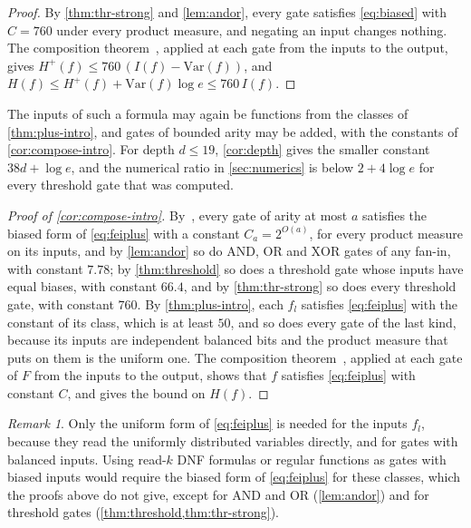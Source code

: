 \documentclass[11pt]{amsart}
\theoremstyle{definition}
\theoremstyle{remark}
\newtheorem{remark}[theorem]{Remark}
\newcommand{\Var}{\mathrm{Var}}
\begin{document}
\begin{proof}
By \cref{thm:thr-strong} and \cref{lem:andor}, every gate satisfies \eqref{eq:biased} with $C=760$ under every
product measure, and negating an input changes nothing. The composition theorem~\cite[Theorem~1]{OT13}, applied at
each gate from the inputs to the output, gives $H^+(f)\le760\,(I(f)-\Var(f))$, and
$H(f)\le H^+(f)+\Var(f)\log e\le760\,I(f)$.
\end{proof}

The inputs of such a formula may again be functions from the classes of \cref{thm:plus-intro}, and gates of bounded
arity may be added, with the constants of \cref{cor:compose-intro}. For depth $d\le19$, \cref{cor:depth} gives the
smaller constant $38d+\log e$, and the numerical ratio in \cref{sec:numerics} is below $2+4\log e$ for every threshold
gate that was computed.


\begin{proof}[Proof of \cref{cor:compose-intro}]
By~\cite[Theorem~2]{OT13}, every gate of arity at most $a$ satisfies the biased form of \eqref{eq:feiplus} with a
constant $C_a=2^{O(a)}$, for every product measure on its inputs, and by \cref{lem:andor} so do $\mathrm{AND}$,
$\mathrm{OR}$ and $\mathrm{XOR}$ gates of any fan-in, with constant $7.78$; by \cref{thm:threshold} so does a threshold gate whose inputs have equal biases, with constant
$66.4$, and by \cref{thm:thr-strong} so does every threshold gate, with constant $760$. By \cref{thm:plus-intro},
each $f_l$ satisfies
\eqref{eq:feiplus} with the constant of its class, which is at least $50$, and so does every gate of the last kind,
because its inputs are independent balanced bits and the product measure that~\cite[Theorem~1]{OT13} puts on them is
the uniform one. The composition theorem~\cite[Theorem~1]{OT13}, applied at each gate of $F$ from the inputs to the
output, shows that $f$ satisfies \eqref{eq:feiplus} with constant $C$, and \cite[Proposition~2.1]{OT13} gives the
bound on $H(f)$.
\end{proof}

\begin{remark}
Only the uniform form of \eqref{eq:feiplus} is needed for the inputs $f_l$, because they read the uniformly
distributed variables directly, and for gates with balanced inputs. Using read-$k$ DNF formulas or regular
functions as gates with biased inputs would require the biased form of \eqref{eq:feiplus} for these classes, which
the proofs above do not give, except for $\mathrm{AND}$ and $\mathrm{OR}$ (\cref{lem:andor}) and for threshold gates
(\cref{thm:threshold,thm:thr-strong}).
\end{remark}
\end{document}
